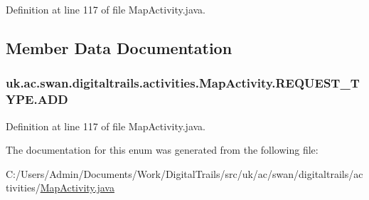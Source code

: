Definition at line 117 of file Map\+Activity.\+java.



\subsection{Member Data Documentation}
\hypertarget{enumuk_1_1ac_1_1swan_1_1digitaltrails_1_1activities_1_1_map_activity_1_1_r_e_q_u_e_s_t___t_y_p_e_aa29be13c973a663e296ea42a862b9659}{
\subsubsection[{A\+D\+D}]{\setlength{\rightskip}{0pt plus 5cm}uk.\+ac.\+swan.\+digitaltrails.\+activities.\+Map\+Activity.\+R\+E\+Q\+U\+E\+S\+T\+\_\+\+T\+Y\+P\+E.\+A\+D\+D}}\label{enumuk_1_1ac_1_1swan_1_1digitaltrails_1_1activities_1_1_map_activity_1_1_r_e_q_u_e_s_t___t_y_p_e_aa29be13c973a663e296ea42a862b9659}


Definition at line 117 of file Map\+Activity.\+java.



The documentation for this enum was generated from the following file\+:\begin{DoxyCompactItemize}
\item 
C\+:/\+Users/\+Admin/\+Documents/\+Work/\+Digital\+Trails/src/uk/ac/swan/digitaltrails/activities/\hyperlink{_map_activity_8java}{Map\+Activity.\+java}\end{DoxyCompactItemize}
